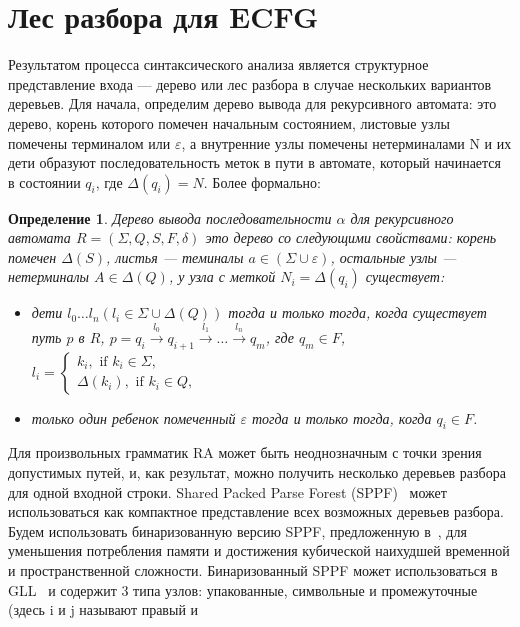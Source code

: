 \documentclass[12pt]{matmex-diploma-custom}
\newtheorem{mydef}{Определение}
\begin{document}
	\section{Лес разбора для ECFG}
	Результатом процесса синтаксического анализа является структурное представление 
	входа --- дерево или лес разбора в случае нескольких вариантов деревьев.
	Для начала, определим дерево вывода для рекурсивного автомата: 
	это дерево, корень которого помечен начальным состоянием, листовые узлы помечены
	терминалом или $\varepsilon$, а внутренние узлы помечены нетерминалами N и их
	дети образуют последовательность меток в пути в автомате, который начинается в 
	состоянии $q_i$, где $ \Delta(q_i) = N $. Более формально:
	
	\begin{mydef}
		
		Дерево вывода последовательности $\alpha$ для рекурсивного автомата $R=(\Sigma, Q, S, F, \delta)$ это дерево со следующими свойствами:
		корень помечен $\Delta(S)$, листья --- теминалы $a\in (\Sigma \cup \varepsilon)$, 
		остальные узлы --- нетерминалы $A\in \Delta(Q)$,
		у узла с меткой $N_i = \Delta(q_i)$ существует:
			\begin{itemize}
				\item 
				дети $l_0 \dots l_n (l_i \in \Sigma \cup \Delta(Q))$ тогда и только тогда,
				когда существует путь $p$ в $R$, $p = q_i \xrightarrow[]{l_0} q_{i+1} \xrightarrow[]{l_1} \dots \xrightarrow{l_n} q_m$, где
				$q_m \in F$, $l_i = 
				\left\{
				\begin{matrix}
				k_i, \text{ if }  k_i \in \Sigma,\\
				\Delta(k_i), \text{ if } k_i \in Q,
				\end{matrix}
				\right.
				$
				\item только один ребенок помеченный $\varepsilon$ тогда и только тогда,
				когда $ q_i \in F $.
			\end{itemize}
	\end{mydef}
	Для произвольных грамматик RA может быть неоднозначным с точки зрения допустимых путей,
	и, как результат, можно получить несколько деревьев разбора для одной входной строки.
	Shared Packed Parse Forest (SPPF)~\cite{SPPF} может использоваться как компактное
	представление всех возможных деревьев разбора. Будем использовать бинаризованную версию SPPF,
	предложенную в~\cite{brnglr}, для уменьшения потребления памяти и достижения кубической
	наихудшей временной и пространственной сложности. Бинаризованный SPPF может использоваться
	в GLL~\cite{scott2013gll} и содержит 3 типа узлов: упакованные, символьные и промежуточные (здесь i и j называют правый и
\end{document}

